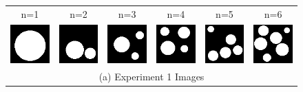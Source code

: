 \documentclass[letterpaper]{article} %
\begin{document}
\begin{figure}[!htbp]%
\centering
\footnotesize 
\begin{tabular}{cccccc}
\multicolumn{1}{c}{n=1} \hspace{-12pt} &  
\multicolumn{1}{c}{n=2} \hspace{-12pt} & 
\multicolumn{1}{c}{n=3} \hspace{-12pt} & 
\multicolumn{1}{c}{n=4} \hspace{-12pt} & 
\multicolumn{1}{c}{n=5} \hspace{-12pt} & 
\multicolumn{1}{c}{n=6} \\

\multicolumn{1}{c}{\includegraphics[width=0.125\columnwidth]{images/circle_1.png}} \hspace{-12pt} &  \multicolumn{1}{c}{\includegraphics[width=0.125\columnwidth]{images/circle_2.png}} \hspace{-12pt} & \multicolumn{1}{c}{\includegraphics[width=0.125\columnwidth]{images/circle_3.png}} \hspace{-12pt} & \multicolumn{1}{c}{\includegraphics[width=0.125\columnwidth]{images/circle_4.png}} \hspace{-12pt} & \multicolumn{1}{c}{\includegraphics[width=0.125\columnwidth]{images/circle_5.png}} \hspace{-12pt} & \multicolumn{1}{c}{\includegraphics[width=0.125\columnwidth]{images/circle_6.png}} \\ 
\multicolumn{6}{c}{(a) Experiment 1 Images} \\


\end{tabular}
\end{figure}
\end{document}
